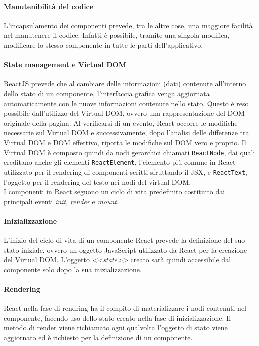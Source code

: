 \paragraph{Manutenibilità del codice} L'incapsulamento dei componenti prevede, tra le altre cose, una maggiore facilità nel manutenere il codice. Infatti è possibile, tramite una singola modifica, modificare lo stesso componente in tutte le parti dell'applicativo.
\paragraph{State management e Virtual DOM} ReactJS prevede che al cambiare delle informazioni (dati) contenute all'interno dello stato di un componente, l'interfaccia grafica venga aggiornata automaticamente con le nuove informazioni contenute nello stato. Questo è reso possibile dall'utilizzo del Virtual DOM, ovvero una rappresentazione del DOM originale della pagina. Al verificarsi di un evento, React occorre le modifiche necessarie sul Virtual DOM e successivamente, dopo l'analisi delle differenze tra Virtual DOM e DOM effettivo, riporta le modifiche sul DOM vero e proprio. Il Virtual DOM è composto quindi da nodi gerarchici chiamati \lstinline[basicstyle=\ttfamily]!ReactNode!, dai quali ereditano anche gli elementi \lstinline[basicstyle=\ttfamily]!ReactElement!, l'elemento più comune in React utilizzato per il rendering di componenti scritti sfruttando il JSX, e \lstinline[basicstyle=\ttfamily]!ReactText!, l'oggetto per il rendering del testo nei nodi del virtual DOM.
\\[12pt]
I componenti in React seguono un ciclo di vita predefinito costituito dai principali eventi \textit{init}, \textit{render} e \textit{mount}.
\paragraph{Inizializzazione} L'inizio del ciclo di vita di un componente React prevede la definizione del suo stato iniziale, ovvero un oggetto JavaScript utilizzato da React per la creazione del Virtual DOM. L'oggetto \textit{<<state>>} creato sarà quindi accessibile dal componente solo dopo la sua inizializzazione.
\paragraph{Rendering} React nella fase di rendring ha il compito di materializzare i nodi contenuti nel componente, facendo uso dello stato creato nella fase di inizializzazione. Il metodo di render viene richiamato ogni qualvolta l'oggetto di stato viene aggiornato ed è richiesto per la definizione di un componente.
